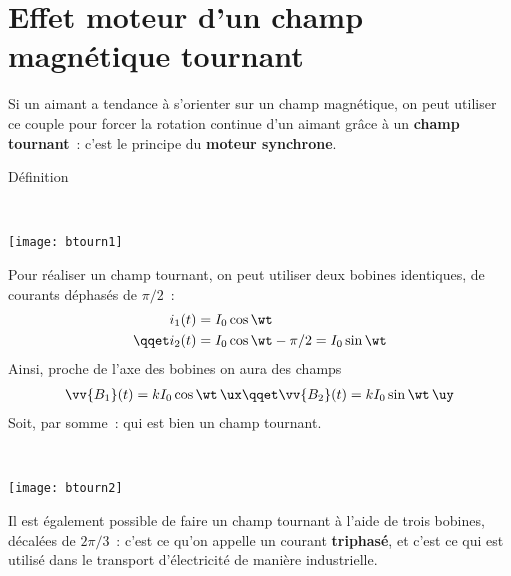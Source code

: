 \documentclass[../main/main.tex]{subfiles}
\begin{document}
\section{Effet moteur d'un champ magnétique tournant}
\label{sec:btourne}
Si un aimant a tendance à s'orienter sur un champ magnétique, on peut utiliser
ce couple pour forcer la rotation continue d'un aimant grâce à un \textbf{champ
	tournant}~: c'est le principe du \textbf{moteur synchrone}.
\begin{tdefi}{Définition}
	\begin{minipage}[c]{.6\linewidth}
		\begin{center}
		\end{center}
	\end{minipage}
	\hfill
	\begin{minipage}[c]{.4\linewidth}
		~
		\begin{center}
			\texttt{[image: btourn1]}
			\label{fig:btourn1}
		\end{center}
	\end{minipage}
\end{tdefi}
\noindent
\begin{minipage}[t]{.5\linewidth}
	Pour réaliser un champ tournant, on peut utiliser deux bobines identiques, de
	courants déphasés de $\pi/2$~:
	\begin{align*}
		i_1(t) & = I_0\cos{\wt}
		\\\qqet
		i_2(t) & = I_0\cos{\wt-\pi/2} = I_0\sin{\wt}
	\end{align*}
	Ainsi, proche de l'axe des bobines on aura des champs
	\begin{gather*}
		\vv{B_1}(t) = k I_0\cos{\wt}\,\ux
		\qqet
		\vv{B_2}(t) = k I_0\sin{\wt}\,\uy
	\end{gather*}
	Soit, par somme~:
	qui est bien un champ tournant.
\end{minipage}
\hfill
\begin{minipage}[t]{.5\linewidth}
	~
	\begin{center}
		\texttt{[image: btourn2]}
		\label{fig:btourn2}
	\end{center}
\end{minipage}
Il est également possible de faire un champ tournant à l'aide de trois bobines,
décalées de $2\pi/3$~: c'est ce qu'on appelle un courant \textbf{triphasé}, et
c'est ce qui est utilisé dans le transport d'électricité de manière
industrielle.
\end{document}
